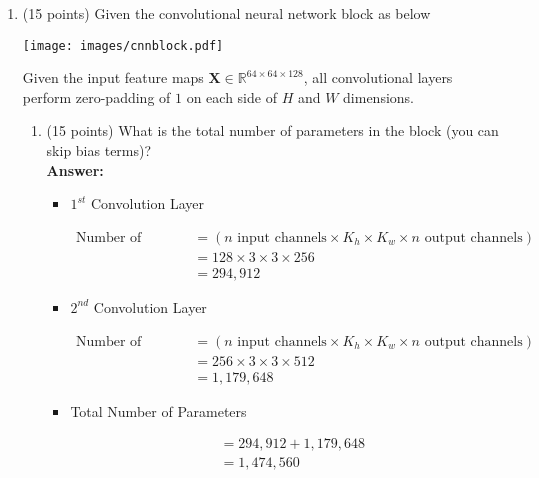 \documentclass[11pt]{article}
\begin{document}
\begin{enumerate}

    \item (15 points) Given the convolutional neural network block as below
    \begin{center}
        \vspace{-10pt}
        \texttt{[image: images/cnnblock.pdf]}
    \end{center}
    Given the input feature maps $\boldsymbol X \in
    \mathbb{R}^{64\times 64 \times 128}$, all convolutional
    layers perform zero-padding of $1$ on each side of $H$ and
    $W$ dimensions.
    \begin{enumerate}
    \item (15 points) What is the total number of parameters in
    the block (you can skip bias terms)?\\

    \textbf{Answer: }

    \begin{itemize}
        \item $1^{st}$ Convolution Layer

            \[\begin{aligned}
                  \text{Number of parameters} &= (n \text{ input channels} \times K_h \times K_w \times n \text{ output channels})\\[5pt]
                  &= 128 \times 3 \times 3 \times 256\\[5pt]
                  &= 294,912
            \end{aligned}\]
            
        \item $2^{nd}$ Convolution Layer

            \[\begin{aligned}
                  \text{Number of parameters} &= (n \text{ input channels} \times K_h \times K_w \times n \text{ output channels})\\[5pt]
                  &= 256 \times 3 \times 3 \times 512\\[5pt]
                  &= 1,179,648
            \end{aligned}\]

        \item Total Number of Parameters

            \[\begin{aligned}
                &= 294,912 + 1,179,648\\[5pt]
                &= 1,474,560
            \end{aligned}\]
    \end{itemize}


\end{enumerate}
\end{enumerate}
\end{document}
